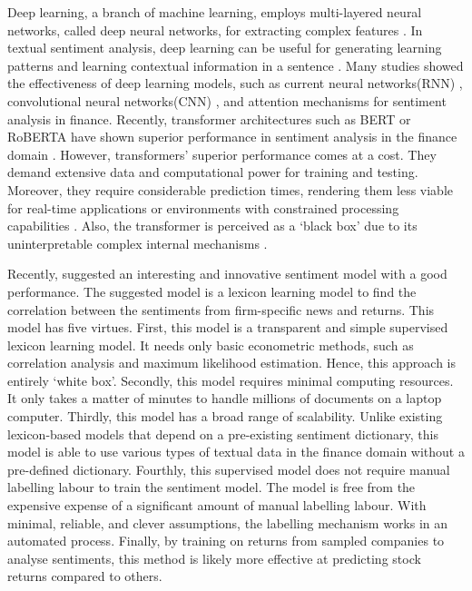 \documentclass[logo,bsc,singlespacing,parskip]{infthesis}
\begin{document}
Deep learning, a branch of machine learning, employs multi-layered neural networks, called deep neural networks, for extracting complex features \cite{IBMDeepLearning}. In textual sentiment analysis, deep learning can be useful for generating learning patterns and learning contextual information in a sentence \cite{Zhang2018}. Many studies showed the effectiveness of deep learning models, such as current neural networks(RNN) \cite{Tang2015, Tai2015}, convolutional neural networks(CNN) \cite{Kim2014, Zhang2015, Johnson2017}, and attention mechanisms \cite{Sohangir2018, Yang2016} for sentiment analysis in finance. Recently, transformer architectures such as BERT or RoBERTA have shown superior performance in sentiment analysis in the finance domain \cite{Mishev2020}. However, transformers’ superior performance comes at a cost. They demand extensive data and computational power for training and testing. Moreover, they require considerable prediction times, rendering them less viable for real-time applications or environments with constrained processing capabilities \cite{Rizinski2024}. Also, the transformer is perceived as a ‘black box’ due to its uninterpretable complex internal mechanisms \cite{Dobson2023}. 

Recently, \cite{ke2020predicting} suggested an interesting and innovative sentiment model with a good performance. The suggested model is a lexicon learning model to find the correlation between the sentiments from firm-specific news and returns. This model has five virtues. First, this model is a transparent and simple supervised lexicon learning model. It needs only basic econometric methods, such as correlation analysis and maximum likelihood estimation. Hence, this approach is entirely ‘white box’. Secondly, this model requires minimal computing resources. It only takes a matter of minutes to handle millions of documents on a laptop computer. 
Thirdly, this model has a broad range of scalability. Unlike existing lexicon-based models that depend on a pre-existing sentiment dictionary, this model is able to use various types of textual data in the finance domain without a pre-defined dictionary. Fourthly, this supervised model does not require manual labelling labour to train the sentiment model. The model is free from the expensive expense of a significant amount of manual labelling labour. With minimal, reliable, and clever assumptions, the labelling mechanism works in an automated process. Finally, by training on returns from sampled companies to analyse sentiments, this method is likely more effective at predicting stock returns compared to others.
\end{document}

